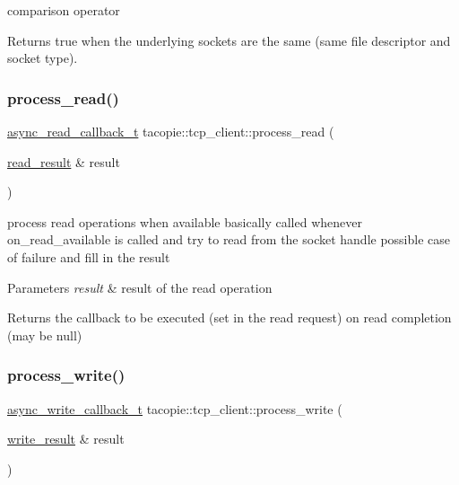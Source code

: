 comparison operator

\begin{DoxyReturn}{Returns}
true when the underlying sockets are the same (same file descriptor and socket type). 
\end{DoxyReturn}
\mbox{\label{classtacopie_1_1tcp__client_a40308b6a1642a79a35a2b2d9c9b9a3f7}} 
\subsubsection{\texorpdfstring{process\+\_\+read()}{process\_read()}}
{\footnotesize\ttfamily \hyperlink{classtacopie_1_1tcp__client_acdf9dea8bac6c56f7b04ce38b9432322}{async\+\_\+read\+\_\+callback\+\_\+t} tacopie\+::tcp\+\_\+client\+::process\+\_\+read (\begin{DoxyParamCaption}\item[{\hyperlink{structtacopie_1_1tcp__client_1_1read__result}{read\+\_\+result} \&}]{result }\end{DoxyParamCaption})\hspace{0.3cm}{\ttfamily [private]}}

process read operations when available basically called whenever on\+\_\+read\+\_\+available is called and try to read from the socket handle possible case of failure and fill in the result


\begin{DoxyParams}{Parameters}
{\em result} & result of the read operation \\
\hline
\end{DoxyParams}
\begin{DoxyReturn}{Returns}
the callback to be executed (set in the read request) on read completion (may be null) 
\end{DoxyReturn}
\mbox{\label{classtacopie_1_1tcp__client_afd5e43d5f44930894de10ce05268607f}} 
\subsubsection{\texorpdfstring{process\+\_\+write()}{process\_write()}}
{\footnotesize\ttfamily \hyperlink{classtacopie_1_1tcp__client_ad48b8c8dff8a77490eb2e3e802c82b97}{async\+\_\+write\+\_\+callback\+\_\+t} tacopie\+::tcp\+\_\+client\+::process\+\_\+write (\begin{DoxyParamCaption}\item[{\hyperlink{structtacopie_1_1tcp__client_1_1write__result}{write\+\_\+result} \&}]{result }\end{DoxyParamCaption})\hspace{0.3cm}{\ttfamily [private]}}

